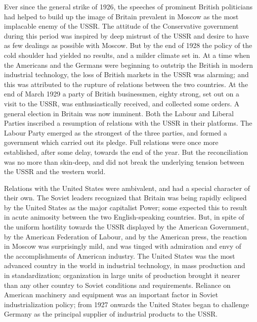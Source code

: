 Ever since the general strike of 1926, the speeches of prominent British politicians had helped to build up the image of Britain prevalent in Moscow as the most implacable enemy of the USSR. The attitude of the Conservative government during this period was inspired by deep mistrust of the USSR and desire to have as few dealings as possible with Moscow. But by the end of 1928 the policy of the cold shoulder had yielded no results, and a milder climate set in. At a time when the Americans and the Germans were beginning to outstrip the British in modern industrial technology, the loss of British markets in the USSR was alarming; and this was attributed to the rupture of relations between the two countries. At the end of March 1929 a party of British businessmen, eighty strong, set out on a visit to the USSR, was enthusiastically received, and collected some orders. A general election in Britain was now imminent. Both the Labour and Liberal Parties inscribed a resumption of relations with the USSR in their platforms. The Labour Party emerged as the strongest of the three parties, and formed a government which carried out its pledge. Full relations were once more established, after some delay, towards the end of the year. But the reconciliation was no more than skin-deep, and did not break the underlying tension between the USSR and the western world. 

Relations with the United States were ambivalent, and had a special character of their own. The Soviet leaders recognized that Britain was being rapidly eclipsed by the United States as the major capitalist Power; some expected this to result in acute animosity between the two English-speaking countries. But, in spite of the uniform hostility towards the USSR displayed by the American Government, by the American Federation of Labour, and by the American press, the reaction in Moscow was surprisingly mild, and was tinged with admiration and envy of the accomplishments of American industry. The United States was the most advanced country in the world in industrial technology, in mass production and in standardization; organization in large units of production brought it nearer than any other country to Soviet conditions and requirements. Reliance on American machinery and equipment was an important factor in Soviet industrialization policy; from 1927 onwards the United States began to challenge Germany as the principal supplier of industrial products to the USSR. 

